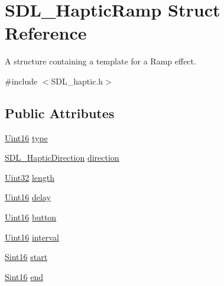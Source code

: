 \hypertarget{struct_s_d_l___haptic_ramp}{}\section{S\+D\+L\+\_\+\+Haptic\+Ramp Struct Reference}
\label{struct_s_d_l___haptic_ramp}


A structure containing a template for a Ramp effect.  




{\ttfamily \#include $<$S\+D\+L\+\_\+haptic.\+h$>$}

\subsection*{Public Attributes}
\begin{DoxyCompactItemize}
\item 
\mbox{\hyperlink{_s_d_l__stdinc_8h_a31fcc0a076c9068668173ee26d33e42b}{Uint16}} \mbox{\hyperlink{struct_s_d_l___haptic_ramp_aca1c2349372433822ab62f60976640aa}{type}}
\item 
\mbox{\hyperlink{struct_s_d_l___haptic_direction}{S\+D\+L\+\_\+\+Haptic\+Direction}} \mbox{\hyperlink{struct_s_d_l___haptic_ramp_a6fb6c67ccf262b8f3ec08bcdf08f9965}{direction}}
\item 
\mbox{\hyperlink{_s_d_l__stdinc_8h_add440eff171ea5f55cb00c4a9ab8672d}{Uint32}} \mbox{\hyperlink{struct_s_d_l___haptic_ramp_a57e75237507701405af2a3caf34cdb5a}{length}}
\item 
\mbox{\hyperlink{_s_d_l__stdinc_8h_a31fcc0a076c9068668173ee26d33e42b}{Uint16}} \mbox{\hyperlink{struct_s_d_l___haptic_ramp_ac9471016f41919b4a1c786bbd649a777}{delay}}
\item 
\mbox{\hyperlink{_s_d_l__stdinc_8h_a31fcc0a076c9068668173ee26d33e42b}{Uint16}} \mbox{\hyperlink{struct_s_d_l___haptic_ramp_a2027c6fd88f1ebe652c90c71410ee0bf}{button}}
\item 
\mbox{\hyperlink{_s_d_l__stdinc_8h_a31fcc0a076c9068668173ee26d33e42b}{Uint16}} \mbox{\hyperlink{struct_s_d_l___haptic_ramp_a4b89d108cfa7e96ea58b58771334c33d}{interval}}
\item 
\mbox{\hyperlink{_s_d_l__stdinc_8h_a9d0257032c0e146ab6121bf0122712f5}{Sint16}} \mbox{\hyperlink{struct_s_d_l___haptic_ramp_acc0e813ac6399290fd4a788d2471e8d4}{start}}
\item 
\mbox{\hyperlink{_s_d_l__stdinc_8h_a9d0257032c0e146ab6121bf0122712f5}{Sint16}} \mbox{\hyperlink{struct_s_d_l___haptic_ramp_a16dd3ee307795248e21ee45ba8fb4c6c}{end}}
\item 

\end{DoxyCompactItemize}
